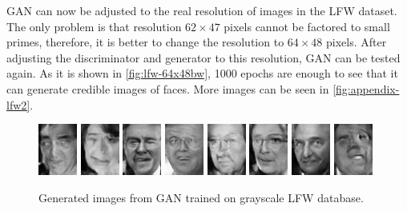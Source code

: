 GAN can now be adjusted to the real resolution of images in the LFW dataset. The only problem is that resolution $62\times 47$ pixels cannot be factored to small primes, therefore, it is better to change the resolution to $64\times 48$ pixels. After adjusting the discriminator and generator to this resolution, GAN can be tested again. As it is shown in \autoref{fig:lfw-64x48bw}, 1000 epochs are enough to see that it can generate credible images of faces. More images can be seen in \autoref{fig:appendix-lfw2}.

\begin{figure}[!h]
    \centerline{
        \includegraphics[scale=1]{figures/lfw/appendix2/lfw64x48bw_image0000.png}
        \includegraphics[scale=1]{figures/lfw/appendix2/lfw64x48bw_image0001.png}
        \includegraphics[scale=1]{figures/lfw/appendix2/lfw64x48bw_image0002.png}
        \includegraphics[scale=1]{figures/lfw/appendix2/lfw64x48bw_image0003.png}
        \includegraphics[scale=1]{figures/lfw/appendix2/lfw64x48bw_image0004.png}
        \includegraphics[scale=1]{figures/lfw/appendix2/lfw64x48bw_image0005.png}
        \includegraphics[scale=1]{figures/lfw/appendix2/lfw64x48bw_image0006.png}
        \includegraphics[scale=1]{figures/lfw/appendix2/lfw64x48bw_image0007.png}
    }
    \caption{\label{fig:lfw-64x48bw}Generated images from GAN trained on grayscale LFW database.}
\end{figure}

